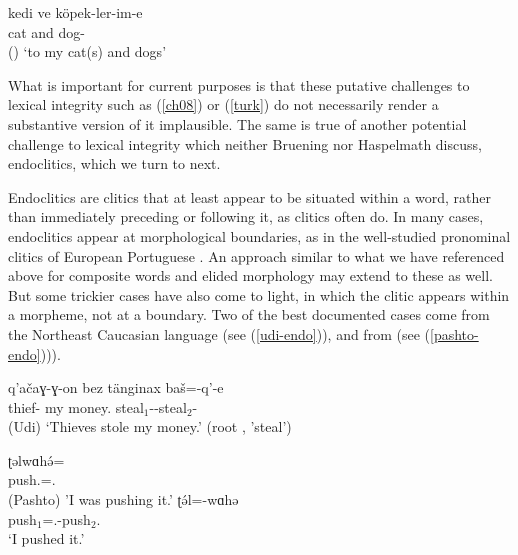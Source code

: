 \documentclass[output=paper
 	        ,biblatex
                ,babelshorthands
                ,newtxmath
                ,draftmode
                ,colorlinks, citecolor=brown
]{langscibook}
\begin{document}
\ea
\label{turk}
\gll kedi ve köpek-ler-im-e \\
     cat and dog- \\\hfill()
\glt `to my cat(s) and dogs'	
\z

What is important for current purposes is that these putative challenges to lexical integrity such as (\ref{ch08}) or (\ref{turk}) do not necessarily render a substantive version of it implausible. The same is true of another potential challenge to lexical integrity which neither Bruening nor Haspelmath discuss, endoclitics, which we turn to next.

Endoclitics are clitics that at least appear to be situated within a word, rather than immediately
preceding or following it, as clitics often do.
In many cases, endoclitics appear at morphological boundaries, as in the well-studied pronominal clitics of European Portuguese \citep{Crysmann2000a}. An approach similar to what we have referenced above for composite words and elided morphology may extend to these as well. But some trickier cases have also come to light, in which the clitic appears within a morpheme, not at a boundary. Two of the best documented cases come from the Northeast Caucasian language  \citep{Harris2000} (see (\ref{udi-endo})), and from  \citep{Tegey1977,Roberts2000,Dost2007} (see (\ref{pashto-endo}))).

\ea
\label{udi-endo}
\gll q'a\v{c}aɣ-ɣ-on bez t\"{a}nginax ba\v{s}=-q'-e\footnotemark\\
     thief- my money. steal$_{1}$--steal$_{2}$- \\\hfill(Udi)
\glt `Thieves stole my money.' (root , 'steal') 
\z

\eal
\label{pashto-endo}
\ex\label{pashto-endo-a}
\gll ʈəlwɑhə́=\footnotemark \\
     push.=. \\\hfill(Pashto)
\glt 'I was pushing it.'
\ex\label{pashto-endo-b}
\gll ʈə́l=-wɑhə\footnotemark \\
     push$_{1}$=.-push$_{2}$. \\
\glt `I pushed it.'
\zl
\end{document}
